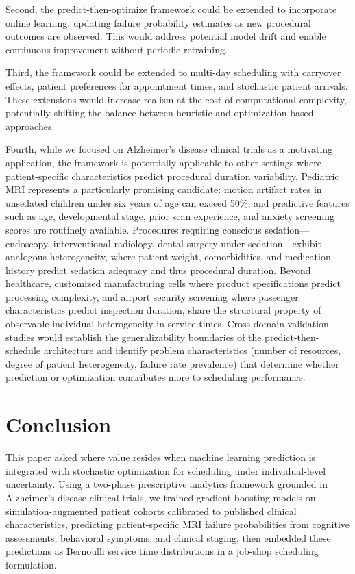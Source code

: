 \documentclass[11pt,a4paper]{article}
\begin{document}
Second, the predict-then-optimize framework could be extended to incorporate online learning, updating failure probability estimates as new procedural outcomes are observed. This would address potential model drift and enable continuous improvement without periodic retraining.

Third, the framework could be extended to multi-day scheduling with carryover effects, patient preferences for appointment times, and stochastic patient arrivals. These extensions would increase realism at the cost of computational complexity, potentially shifting the balance between heuristic and optimization-based approaches.

Fourth, while we focused on Alzheimer's disease clinical trials as a motivating application, the framework is potentially applicable to other settings where patient-specific characteristics predict procedural duration variability. Pediatric MRI represents a particularly promising candidate: motion artifact rates in unsedated children under six years of age can exceed 50\%, and predictive features such as age, developmental stage, prior scan experience, and anxiety screening scores are routinely available. Procedures requiring conscious sedation---endoscopy, interventional radiology, dental surgery under sedation---exhibit analogous heterogeneity, where patient weight, comorbidities, and medication history predict sedation adequacy and thus procedural duration. Beyond healthcare, customized manufacturing cells where product specifications predict processing complexity, and airport security screening where passenger characteristics predict inspection duration, share the structural property of observable individual heterogeneity in service times. Cross-domain validation studies would establish the generalizability boundaries of the predict-then-schedule architecture and identify problem characteristics (number of resources, degree of patient heterogeneity, failure rate prevalence) that determine whether prediction or optimization contributes more to scheduling performance.



\section{Conclusion}
\label{sec:conclusion}

This paper asked where value resides when machine learning prediction is integrated with stochastic optimization for scheduling under individual-level uncertainty. Using a two-phase prescriptive analytics framework grounded in Alzheimer's disease clinical trials, we trained gradient boosting models on simulation-augmented patient cohorts calibrated to published clinical characteristics, predicting patient-specific MRI failure probabilities from cognitive assessments, behavioral symptoms, and clinical staging, then embedded these predictions as Bernoulli service time distributions in a job-shop scheduling formulation.
\end{document}
